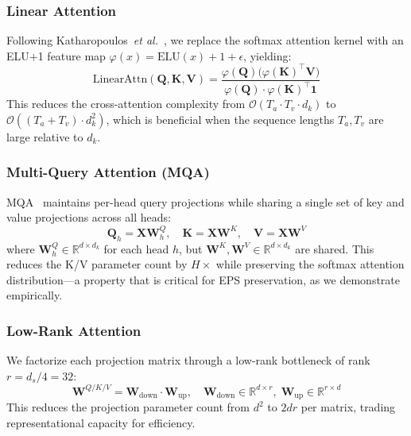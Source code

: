 \documentclass[lettersize,journal]{IEEEtran}
\begin{document}
\subsubsection{Linear Attention}
Following Katharopoulos~\textit{et al.}~\cite{katharopoulos2020linear}, we replace the softmax attention kernel with an ELU$+$1 feature map $\varphi(x) = \text{ELU}(x) + 1 + \epsilon$, yielding:
\begin{equation}
\label{eq:linear_attn}
    \text{LinearAttn}(\mathbf{Q}, \mathbf{K}, \mathbf{V}) = \frac{\varphi(\mathbf{Q})\bigl(\varphi(\mathbf{K})^\top \mathbf{V}\bigr)}{\varphi(\mathbf{Q}) \cdot \varphi(\mathbf{K})^\top \mathbf{1}}
\end{equation}
This reduces the cross-attention complexity from $\mathcal{O}(T_a \cdot T_v \cdot d_k)$ to $\mathcal{O}((T_a + T_v) \cdot d_k^2)$, which is beneficial when the sequence lengths $T_a, T_v$ are large relative to $d_k$.

\subsubsection{Multi-Query Attention (MQA)}
MQA~\cite{shazeer2019mqa} maintains per-head query projections while sharing a single set of key and value projections across all heads:
\begin{equation}
    \mathbf{Q}_h = \mathbf{X}\mathbf{W}^Q_h, \quad \mathbf{K} = \mathbf{X}\mathbf{W}^K, \quad \mathbf{V} = \mathbf{X}\mathbf{W}^V
\end{equation}
where $\mathbf{W}^Q_h \in \mathbb{R}^{d \times d_k}$ for each head $h$, but $\mathbf{W}^K, \mathbf{W}^V \in \mathbb{R}^{d \times d_k}$ are shared. This reduces the K/V parameter count by $H\times$ while preserving the softmax attention distribution---a property that is critical for EPS preservation, as we demonstrate empirically.

\subsubsection{Low-Rank Attention}
We factorize each projection matrix through a low-rank bottleneck of rank $r = d_s / 4 = 32$:
\begin{equation}
    \mathbf{W}^{Q/K/V} = \mathbf{W}_{\text{down}} \cdot \mathbf{W}_{\text{up}}, \quad \mathbf{W}_{\text{down}} \in \mathbb{R}^{d \times r}, \; \mathbf{W}_{\text{up}} \in \mathbb{R}^{r \times d}
\end{equation}
This reduces the projection parameter count from $d^2$ to $2dr$ per matrix, trading representational capacity for efficiency.
\end{document}
